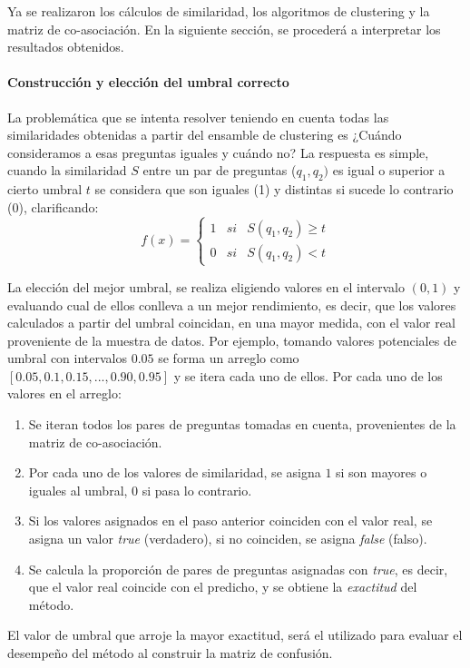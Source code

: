 Ya se realizaron los cálculos de similaridad, los algoritmos de clustering y la matriz de co-asociación. En la siguiente sección, se procederá a interpretar los resultados obtenidos.

\paragraph{Construcción y elección del umbral correcto}
La problemática que se intenta resolver teniendo en cuenta todas las similaridades obtenidas a partir del ensamble de clustering es ¿Cuándo consideramos a esas preguntas iguales y cuándo no? La respuesta es simple, cuando la similaridad \(S\) entre un par de preguntas (\(q_1,q_2)\) es igual o superior a cierto umbral \(t\) se considera que son iguales (1) y distintas si sucede lo contrario (0), clarificando:
\[f(x) = \left\{ \begin{array}{lcc} 1 & si & S(q_1, q_2)\geq t
	\\ 0 & si & S(q_1, q_2) < t
\end{array} \right.\]

La elección del mejor umbral, se realiza eligiendo valores en el intervalo \((0,1)\) y evaluando cual de ellos conlleva a un mejor rendimiento, es decir, que los valores calculados a partir del umbral coincidan, en una mayor medida, con el valor real proveniente de la muestra de datos. Por ejemplo, tomando valores potenciales de umbral con intervalos \(0.05\) se forma un arreglo como \([0.05, 0.1, 0.15, ..., 0.90, 0.95]\) y se itera cada uno de ellos. Por cada uno de los valores en el arreglo:
\begin{enumerate}
	\item Se iteran todos los pares de preguntas tomadas en cuenta, provenientes de la matriz de co-asociación.
	\item Por cada uno de los valores de similaridad, se asigna \(1\) si son mayores o iguales al umbral, \(0\) si pasa lo contrario.
	\item Si los valores asignados en el paso anterior coinciden con el valor real, se asigna un valor \textit{true} (verdadero), si no coinciden, se asigna \textit{false} (falso).
	\item Se calcula la proporción de pares de preguntas asignadas con \textit{true}, es decir, que el valor real coincide con el predicho, y se obtiene la \textit{exactitud} del método.
\end{enumerate}
El valor de umbral que arroje la mayor exactitud, será el utilizado para evaluar el desempeño del método al construir la matriz de confusión.

